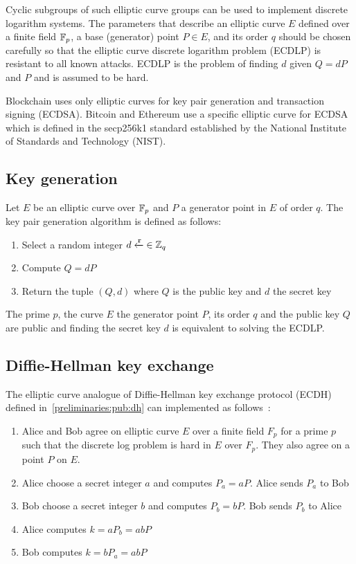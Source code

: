 Cyclic subgroups of such elliptic curve groups can be used to implement discrete logarithm systems. The parameters that describe an elliptic curve $E$ defined over a finite field $\mathbb{F}_p$, a base (generator) point $P \in E$, and its order $q$ should be chosen carefully so that the elliptic curve discrete logarithm problem (ECDLP) is resistant to all known attacks. ECDLP is the problem of finding $d$ given $Q = dP$ and $P$ and is assumed to be hard.

Blockchain uses only elliptic curves for key pair generation and transaction signing (ECDSA). Bitcoin and Ethereum use a specific elliptic curve for ECDSA which is defined in the secp256k1 standard established by the National Institute of Standards and Technology (NIST).

\subsection[Key generation]{Key generation~\cite{elliptic_curves_2}}
\label{preliminaries:el_curves:key_gen}

Let $E$ be an elliptic curve over $\mathbb{F}_p$ and $P$ a generator point in $E$ of order $q$. The key pair generation algorithm is defined as follows:

\begin{enumerate}
  \item Select a random integer $d \xleftarrow{\mathtt{r}}{\in \mathbb{Z}_q}$
  \item Compute $Q = dP$
  \item Return the tuple $(Q, d)$ where $Q$ is the public key and $d$ the secret key
\end{enumerate}

The prime $p$, the curve $E$ the generator point $P$, its order $q$ and the public key $Q$ are public and finding the secret key $d$ is equivalent to solving the ECDLP.

\subsection{Diffie-Hellman key exchange}
\label{preliminaries:el_curves:dh}

The elliptic curve analogue of Diffie-Hellman key exchange protocol (ECDH) defined in~\ref{preliminaries:pub:dh} can implemented as follows~\cite{elliptic_curves}:

\begin{enumerate}
  \item Alice and Bob agree on elliptic curve $E$ over a finite field $F_p$ for a prime $p$ such that the discrete log problem is hard in $E$ over $F_p$. They also agree on a point $P$ on $E$.
  \item Alice choose a secret integer $a$ and computes $P_a = aP$. Alice sends $P_a$ to Bob
  \item Bob choose a secret integer $b$ and computes $P_b = bP$. Bob sends $P_b$ to Alice
  \item Alice computes $k = aP_b = abP$
  \item Bob computes $k = bP_a = abP$
\end{enumerate}

